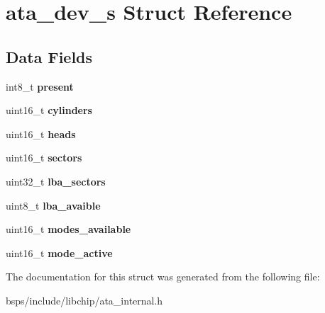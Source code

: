 \hypertarget{structata__dev__s}{}\section{ata\+\_\+dev\+\_\+s Struct Reference}
\label{structata__dev__s}
\subsection*{Data Fields}
\begin{DoxyCompactItemize}
\item 
\mbox{\label{structata__dev__s_a9918046b72935b60ab41b8c540de5102}} 
int8\+\_\+t {\bfseries present}
\item 
\mbox{\label{structata__dev__s_adecc139ba731353ed94494de7337e1f9}} 
uint16\+\_\+t {\bfseries cylinders}
\item 
\mbox{\label{structata__dev__s_a32c6625b0976739e3605a0e14f14a00f}} 
uint16\+\_\+t {\bfseries heads}
\item 
\mbox{\label{structata__dev__s_ab7cf2c35c60361131914d401a780a51a}} 
uint16\+\_\+t {\bfseries sectors}
\item 
\mbox{\label{structata__dev__s_a306070b8ce38b62b361c8abbed6685c3}} 
uint32\+\_\+t {\bfseries lba\+\_\+sectors}
\item 
\mbox{\label{structata__dev__s_a8b02f3df4800c07dedc82103ebe42713}} 
uint8\+\_\+t {\bfseries lba\+\_\+avaible}
\item 
\mbox{\label{structata__dev__s_a2f4ee8cfb7b051d0ed8f9a44c08e9e7d}} 
uint16\+\_\+t {\bfseries modes\+\_\+available}
\item 
\mbox{\label{structata__dev__s_ad4853cca477dd823602ce2730cc06797}} 
uint16\+\_\+t {\bfseries mode\+\_\+active}
\end{DoxyCompactItemize}


The documentation for this struct was generated from the following file\+:\begin{DoxyCompactItemize}
\item 
bsps/include/libchip/ata\+\_\+internal.\+h\end{DoxyCompactItemize}
